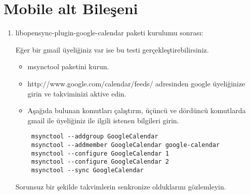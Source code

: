 \documentclass[a4paper,10pt]{article}
\begin{document}
\section{Mobile alt Bileşeni}
\begin{enumerate}
 \item libopensync-plugin-google-calendar paketi kurulumu sonrası:

Eğer bir gmail üyeliğiniz var ise bu testi gerçekleştirebilirsiniz.
\begin{itemize}
 \item msynctool paketini kurun.
 \item http://www.google.com/calendar/feeds/ adresinden google üyeliğinize girin ve takviminizi aktive edin.
 \item Aşağıda bulunan komutları çalıştırın, üçüncü ve dördüncü komutlarda gmail ile üyeliğiniz ile ilgili istenen bilgileri girin.

\begin{verbatim}
 msynctool --addgroup GoogleCalendar
 msynctool --addmember GoogleCalendar google-calendar
 msynctool --configure GoogleCalendar 1
 msynctool --configure GoogleCalendar 2
 msynctool --sync GoogleCalendar	
\end{verbatim}

\end{itemize}

Sorunsuz bir şekilde takvimlerin senkronize olduklarını gözlemleyin.
\end{enumerate}
\end{document}
